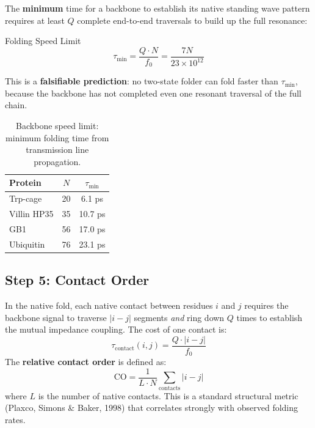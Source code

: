 The \textbf{minimum} time for a backbone to establish its native standing wave pattern requires at least $Q$ complete end-to-end traversals to build up the full resonance:
\begin{resultbox}{Folding Speed Limit}
\begin{equation}
    \tau_\text{min} = \frac{Q \cdot N}{f_0} = \frac{7N}{23 \times 10^{12}}
    \label{eq:tau_min}
\end{equation}
\end{resultbox}
This is a \textbf{falsifiable prediction}: no two-state folder can fold faster than $\tau_\text{min}$, because the backbone has not completed even one resonant traversal of the full chain.

\begin{table}[H]
\centering
\caption{Backbone speed limit: minimum folding time from transmission line propagation.}
\label{tab:speed_limit}
\small
\begin{tabular}{@{}l c c@{}}
\toprule
\textbf{Protein} & $N$ & $\tau_\text{min}$ \\
\midrule
Trp-cage  & 20 & 6.1 ps \\
Villin HP35 & 35 & 10.7 ps \\
GB1       & 56 & 17.0 ps \\
Ubiquitin & 76 & 23.1 ps \\
\bottomrule
\end{tabular}
\end{table}

\subsection{Step 5: Contact Order}
\label{sec:contact_order}

In the native fold, each native contact between residues $i$ and $j$ requires the backbone signal to traverse $|i-j|$ segments \emph{and} ring down $Q$ times to establish the mutual impedance coupling.
The cost of one contact is:
\begin{equation}
    \tau_\text{contact}(i,j) = \frac{Q \cdot |i-j|}{f_0}
    \label{eq:tau_contact}
\end{equation}
The \textbf{relative contact order} is defined as:
\begin{equation}
    \text{CO} = \frac{1}{L \cdot N} \sum_{\text{contacts}} |i - j|
    \label{eq:contact_order}
\end{equation}
where $L$ is the number of native contacts.  This is a standard structural metric (Plaxco, Simons \& Baker, 1998) that correlates strongly with observed folding rates.

